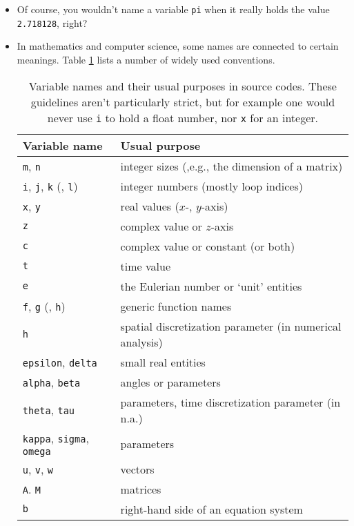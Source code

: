 \begin{itemize}
\item Of course, you wouldn't name a variable \lstinline!pi! when it really holds the value \lstinline!2.718128!, right?
\item In mathematics and computer science, some names are connected to certain meanings. Table \ref{table:typical-variable-usage} lists a number of widely used conventions.

\begin{table}
\centering
\begin{tabular}{ll}
\toprule
Variable name                                                 & Usual purpose\\\midrule
\lstinline!m!, \lstinline!n!                                  & integer sizes (,e.g., the dimension of a matrix)\\
\lstinline!i!, \lstinline!j!, \lstinline!k! (, \lstinline!l!) & integer numbers (mostly loop indices)\\
\lstinline!x!, \lstinline!y!                                  & real values ($x$-, $y$-axis)\\
\lstinline!z!                                                 & complex value or $z$-axis\\
\lstinline!c!                                                 & complex value or constant (or both)\\
\lstinline!t!                                                 & time value\\
\lstinline!e!                                                 & the Eulerian number or `unit' entities\\
\lstinline!f!, \lstinline!g! (, \lstinline!h!)                & generic function names\\
\lstinline!h!                                                 & spatial discretization parameter (in numerical analysis)\\
\lstinline!epsilon!, \lstinline!delta!                        & small real entities\\
\lstinline!alpha!, \lstinline!beta!                           & angles or parameters\\
\lstinline!theta!, \lstinline!tau!                            & parameters, time discretization parameter (in n.a.)\\
\lstinline!kappa!, \lstinline!sigma!, \lstinline!omega!       & parameters\\
\lstinline!u!, \lstinline!v!, \lstinline!w!                   & vectors\\
\lstinline!A!. \lstinline!M!                                  & matrices\\
\lstinline!b!                                                 & right-hand side of an equation system\\\bottomrule
\end{tabular}
\caption{Variable names and their usual purposes in source codes. These guidelines aren't particularly strict, but for example one would never use \lstinline!i! to hold a float number, nor \lstinline!x! for an integer.}
\label{table:typical-variable-usage}
\end{table}
\end{itemize}


